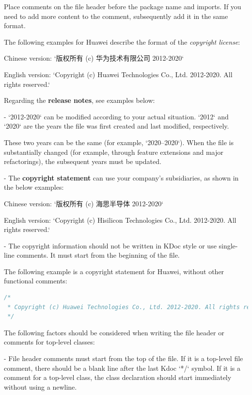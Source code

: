 Place comments on the file header before the package name and imports. If you need to add more content to the comment, subsequently add it in the same format.



The following examples for Huawei describe the format of the \textit{copyright license}: \

Chinese version: `版权所有 (c) 华为技术有限公司 2012-2020` \

English version: `Copyright (c) Huawei Technologies Co., Ltd. 2012-2020. All rights reserved.`



Regarding the \textbf{release notes}, see examples below:



- `2012-2020` can be modified according to your actual situation. `2012` and `2020` are the years the file was first created and last modified, respectively.

These two years can be the same (for example, `2020–2020`). When the file is substantially changed (for example, through feature extensions and major refactorings), the subsequent years must be updated.



- The \textbf{copyright statement} can use your company's subsidiaries, as shown in the below examples: \

Chinese version: `版权所有 (c) 海思半导体 2012-2020` \

English version: `Copyright (c) Hisilicon Technologies Co., Ltd. 2012-2020. All rights reserved.` 



- The copyright information should not be written in KDoc style or use single-line comments. It must start from the beginning of the file.

The following example is a copyright statement for Huawei, without other functional comments:



\begin{lstlisting}[language=Kotlin]
/*
 * Copyright (c) Huawei Technologies Co., Ltd. 2012-2020. All rights reserved.
 */
\end{lstlisting}


The following factors should be considered when writing the file header or comments for top-level classes:

- File header comments must start from the top of the file. If it is a top-level file comment, there should be a blank line after the last Kdoc `*/` symbol. If it is a comment for a top-level class, the class declaration should start immediately without using a newline.

